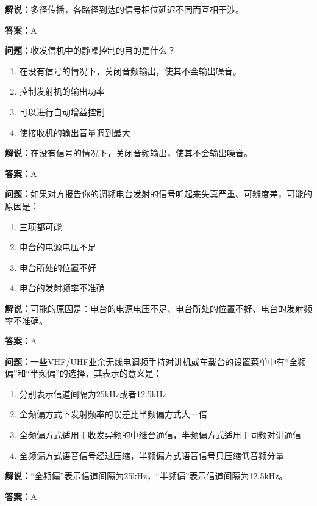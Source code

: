 \textbf{解说：}多径传播，各路径到达的信号相位延迟不同而互相干涉。%

\textbf{答案：}A

\textbf{问题：}收发信机中的静噪控制的目的是什么？

\begin{enumerate}[label=\Alph*), leftmargin=3em]
	\item 在没有信号的情况下，关闭音频输出，使其不会输出噪音。
	\item 控制发射机的输出功率
	\item 可以进行自动增益控制
	\item 使接收机的输出音量调到最大
\end{enumerate}

\textbf{解说：}在没有信号的情况下，关闭音频输出，使其不会输出噪音。%

\textbf{答案：}A

\textbf{问题：}如果对方报告你的调频电台发射的信号听起来失真严重、可辨度差，可能的原因是：

\begin{enumerate}[label=\Alph*), leftmargin=3em]
	\item 三项都可能
	\item 电台的电源电压不足
	\item 电台所处的位置不好
	\item 电台的发射频率不准确
\end{enumerate}

\textbf{解说：}可能的原因是：电台的电源电压不足、电台所处的位置不好、电台的发射频率不准确。%

\textbf{答案：}A

\textbf{问题：}一些VHF/UHF业余无线电调频手持对讲机或车载台的设置菜单中有“全频偏”和“半频偏”的选择，其表示的意义是：

\begin{enumerate}[label=\Alph*), leftmargin=3em]
	\item 分别表示信道间隔为25kHz或者12.5kHz
	\item 全频偏方式下发射频率的误差比半频偏方式大一倍
	\item 全频偏方式适用于收发异频的中继台通信，半频偏方式适用于同频对讲通信
	\item 全频偏方式语音信号经过压缩，半频偏方式语音信号只压缩低音频分量
\end{enumerate}

\textbf{解说：}“全频偏”表示信道间隔为25kHz，“半频偏”表示信道间隔为12.5kHz。%

\textbf{答案：}A

